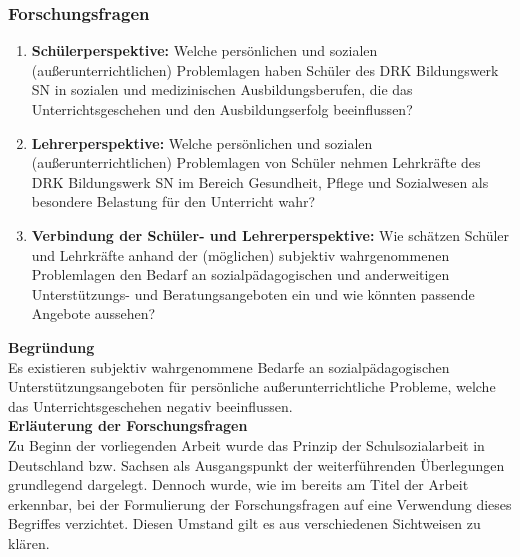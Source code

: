 \subsubsection{Forschungsfragen}
\label{sec:Forschungsfragen}

\begin{enumerate}
	\item \textbf{Schülerperspektive:}
	Welche persönlichen und sozialen (außerunterrichtlichen) Problemlagen haben Schüler des DRK Bildungswerk SN in sozialen und medizinischen Ausbildungsberufen, die das Unterrichtsgeschehen und den Ausbildungserfolg beeinflussen?
	\item \textbf{Lehrerperspektive:}
	Welche persönlichen und sozialen (außerunterrichtlichen) Problemlagen von Schüler nehmen Lehrkräfte des DRK Bildungswerk SN im Bereich Gesundheit, Pflege und Sozialwesen als besondere Belastung für den Unterricht wahr?
	\item \textbf{Verbindung der Schüler- und Lehrerperspektive:}
	Wie schätzen Schüler und Lehrkräfte anhand der (möglichen) subjektiv wahrgenommenen Problemlagen den Bedarf an sozialpädagogischen und anderweitigen Unterstützungs- und Beratungsangeboten ein und wie könnten passende Angebote aussehen?
\end{enumerate}

\noindent
\textbf{Begründung}\\

\noindent
Es existieren subjektiv wahrgenommene Bedarfe an sozialpädagogischen Unterstützungsangeboten für persönliche außerunterrichtliche Probleme, welche das Unterrichtsgeschehen negativ beeinflussen.\\

\noindent
\textbf{Erläuterung der Forschungsfragen}\\

\noindent
Zu Beginn der vorliegenden Arbeit wurde das Prinzip der Schulsozialarbeit in Deutschland bzw. Sachsen als Ausgangspunkt der weiterführenden Überlegungen grundlegend dargelegt. Dennoch wurde, wie im bereits am Titel der Arbeit erkennbar, bei der Formulierung der Forschungsfragen auf eine Verwendung dieses Begriffes verzichtet. Diesen Umstand gilt es aus verschiedenen Sichtweisen zu klären.
 
